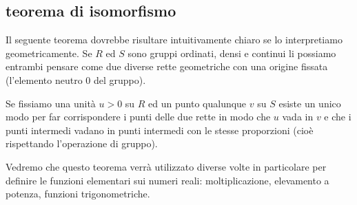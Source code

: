 \subsection{teorema di isomorfismo}
\label{sec:isomorfismo}

% 
% 
Il seguente teorema dovrebbe risultare intuitivamente chiaro 
se lo interpretiamo geometricamente. 
Se $R$ ed $S$ sono gruppi ordinati, densi e continui li possiamo 
entrambi pensare come due diverse rette geometriche con una origine fissata
(l'elemento neutro $0$ del gruppo).

Se fissiamo una unità $u>0$ su $R$ ed un punto qualunque $v$ su $S$ 
esiste un unico modo per far corrispondere i punti delle due rette 
in modo che $u$ vada in $v$ e che i punti intermedi vadano in punti 
intermedi con le stesse proporzioni (cioè rispettando l'operazione
di gruppo).

Vedremo che questo teorema verrà utilizzato diverse volte 
in particolare per definire le funzioni elementari 
sui numeri reali: moltiplicazione, elevamento a potenza, 
funzioni trigonometriche.

